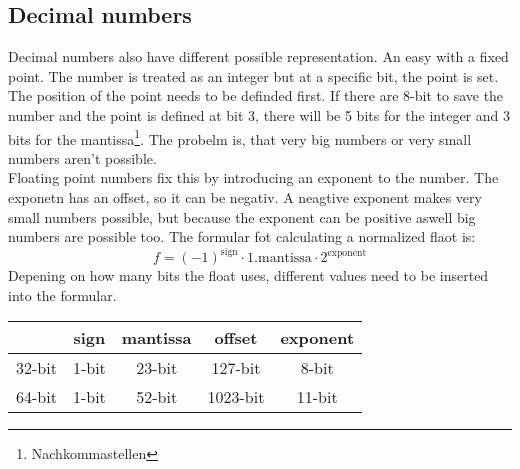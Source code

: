 \documentclass[a4paper]{scrartcl}
\begin{document}
        \subsection*{Decimal numbers}
        Decimal numbers also have different possible representation. An easy with a fixed point. The number is treated as an integer but at a specific bit, the point is 
        set. The position of the point needs to be definded first. If there are 8-bit to save the number and the point is defined at bit 3, there will be 5 bits for the integer
        and 3 bits for the mantissa\footnote{Nachkommastellen}. The probelm is, that very big numbers or very small numbers aren't possible. \\
        Floating point numbers fix this by introducing an exponent to the number. The exponetn has an offset, so it can be negativ. A neagtive exponent makes very small numbers
        possible, but because the exponent can be positive aswell big numbers are possible too. The formular fot calculating a normalized flaot is:
        \begin{equation*}
            f = (-1)^{\text{sign}} \cdot 1.\text{mantissa} \cdot 2^{\text{exponent}}
        \end{equation*}  
        Depening on how many bits the float uses, different values need to be inserted into the formular.
        \begin{center}\begin{tabular}{|c|c|c|c|c|}
            \hline
             & sign & mantissa & offset & exponent \\
            \hline
            32-bit & 1-bit & 23-bit & 127-bit & 8-bit \\
            \hline
            64-bit & 1-bit & 52-bit & 1023-bit & 11-bit \\
            \hline
        \end{tabular}\end{center}
        
\end{document}
